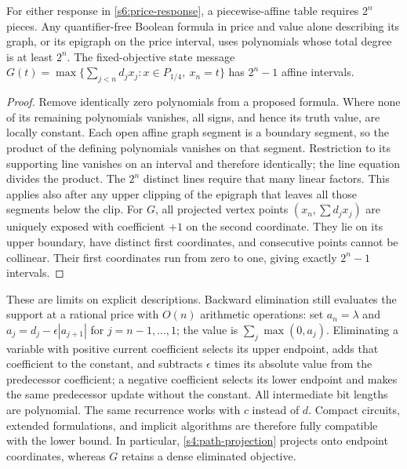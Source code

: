 \begin{corollary}\label{s6:response-size}
For either response in \cref{s6:price-response}, a piecewise-affine table
requires $2^n$ pieces. Any quantifier-free Boolean formula in price and
value alone describing its graph, or its epigraph on the price interval,
uses polynomials whose total degree is at least $2^n$.
The fixed-objective state message
$G(t)=\max\{\sum_{j<n}d_jx_j:x\in P_{1/4},\ x_n=t\}$ has
$2^n-1$ affine intervals.
\end{corollary}
\begin{proof}
Remove identically zero polynomials from a proposed formula. Where none
of its remaining polynomials vanishes, all signs, and hence its truth
value, are locally constant. Each open affine graph segment is a
boundary segment, so the product of the defining polynomials vanishes
on that segment. Restriction to its supporting line vanishes on an
interval and therefore identically; the line equation divides the
product. The $2^n$ distinct lines require that many linear factors.
This applies also after any upper clipping of the epigraph that leaves
all those segments below the clip.
For $G$, all projected vertex points $(x_n,\sum d_jx_j)$ are uniquely
exposed with coefficient $+1$ on the second coordinate. They lie on its
upper boundary, have distinct first coordinates, and consecutive points
cannot be collinear. Their first coordinates run from zero to one,
giving exactly $2^n-1$ intervals.
\end{proof}

These are limits on explicit descriptions. Backward elimination still
evaluates the support at a rational price with $O(n)$ arithmetic operations:
set $a_n=\lambda$ and $a_j=d_j-\epsilon|a_{j+1}|$ for $j=n-1,\ldots,1$;
the value is $\sum_j\max(0,a_j)$. Eliminating a variable with positive
current coefficient selects its upper endpoint, adds that coefficient
to the constant, and subtracts $\epsilon$ times its absolute value from
the predecessor coefficient; a negative coefficient selects its lower
endpoint and makes the same predecessor update without the constant.
All intermediate bit lengths are polynomial. The same recurrence works
with $c$ instead of $d$. Compact circuits, extended formulations, and
implicit algorithms are therefore fully compatible with the lower bound.
In particular, \cref{s4:path-projection} projects onto endpoint coordinates,
whereas $G$ retains a dense eliminated objective.

